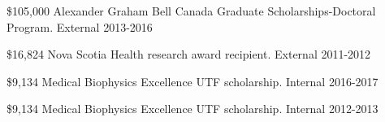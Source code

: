 


\begin{cvhonors}

\cvhonor
{\$105,000} %
{Alexander Graham Bell Canada Graduate Scholarships-Doctoral Program.} %
{External}
{2013-2016} %

\cvhonor
{\$16,824} %
{Nova Scotia Health research award recipient.} %
{External}
{2011-2012} %

\cvhonor
{\$9,134} %
{Medical Biophysics Excellence UTF scholarship.} %
{Internal}
{2016-2017} %

\cvhonor
{\$9,134} %
{Medical Biophysics Excellence UTF scholarship.} %
{Internal}
{2012-2013} %

\end{cvhonors}


